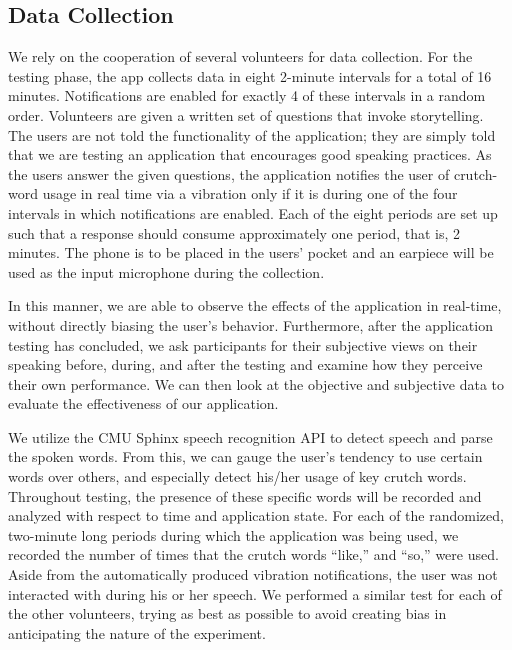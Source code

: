 \documentclass{sigchi}
\begin{document}
\subsection{Data Collection}

We rely on the cooperation of several volunteers for data collection. For the testing phase, the app collects data in eight 2-minute intervals for a total of 16 minutes. Notifications are enabled for exactly 4 of these intervals in a random order. Volunteers are given a written set of questions that invoke storytelling. The users are not told the functionality of the application; they are simply told that we are testing an application that encourages good speaking practices. As the users answer the given questions, the application notifies the user of crutch-word usage in real time via a vibration only if it is during one of the four intervals in which notifications are enabled. Each of the eight periods are set up such that a response should consume approximately one period, that is, 2 minutes. The phone is to be placed in the users’ pocket and an earpiece will be used as the input microphone during the collection.

In this manner, we are able to observe the effects of the application in real-time, without directly biasing the user’s behavior. Furthermore, after the application testing has concluded, we ask participants for their subjective views on their speaking before, during, and after the testing and examine how they perceive their own performance. We can then look at the objective and subjective data to evaluate the effectiveness of our application.

We utilize the CMU Sphinx speech recognition API to detect speech and parse the spoken words. From this, we can gauge the user’s tendency to use certain words over others, and especially detect his/her usage of key crutch words. Throughout testing, the presence of these specific words will be recorded and analyzed with respect to time and application state.  For each of the randomized, two-minute long periods during which the application was being used, we recorded the number of times that the crutch words “like,” and “so,” were used. Aside from the automatically produced vibration notifications, the user was not interacted with during his or her speech. We performed a similar test for each of the other volunteers, trying as best as possible to avoid creating bias in anticipating the nature of the experiment.
\end{document}
